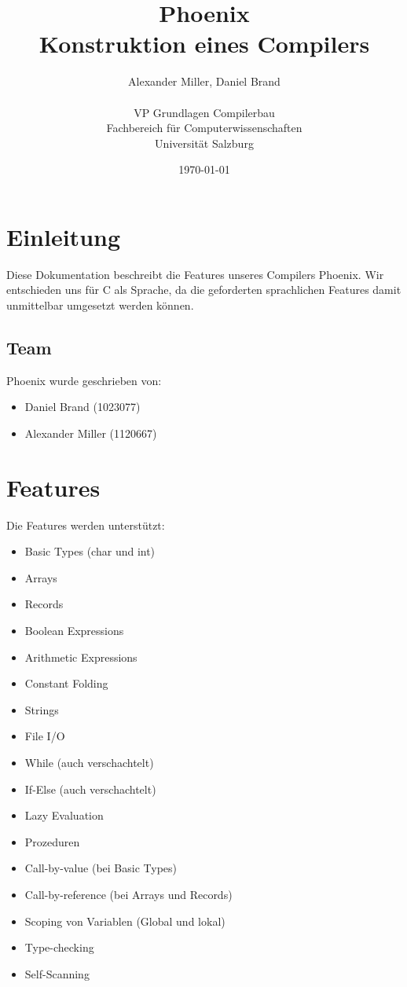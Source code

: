 \documentclass[a4paper,12pt]{article}
\title{Phoenix \\ \large Konstruktion eines Compilers}
\author{Alexander Miller, Daniel Brand \\ \\
		VP Grundlagen Compilerbau \\
		Fachbereich für Computerwissenschaften \\
		Universität Salzburg}
\date{\today}
\begin{document}
	\maketitle
	\tableofcontents
	\newpage

	\section{Einleitung}
	Diese Dokumentation beschreibt die Features unseres Compilers Phoenix.
	Wir entschieden uns für C als Sprache, da die geforderten sprachlichen Features damit unmittelbar umgesetzt werden können.

	\subsection{Team}
	Phoenix wurde geschrieben von:
	\begin{itemize}
		\item Daniel Brand (1023077)
		\item Alexander Miller (1120667)
	\end{itemize}


	\section{Features}




	Die Features werden unterstützt:
	\begin{multicols}{2}
	\begin{itemize}
		\item Basic Types (char und int)
		\item Arrays
		\item Records
		\item Boolean Expressions
		\item Arithmetic Expressions
		\item Constant Folding
		\item Strings
		\item File I/O
		\item While (auch verschachtelt)
		\item If-Else (auch verschachtelt)
		\item Lazy Evaluation
		\item Prozeduren
		\item Call-by-value (bei Basic Types)
		\item Call-by-reference (bei Arrays und Records)
		\item Scoping von Variablen (Global und lokal)
		\item Type-checking
		\item Self-Scanning
	\end{itemize}
	\end{multicols}
\end{document}
